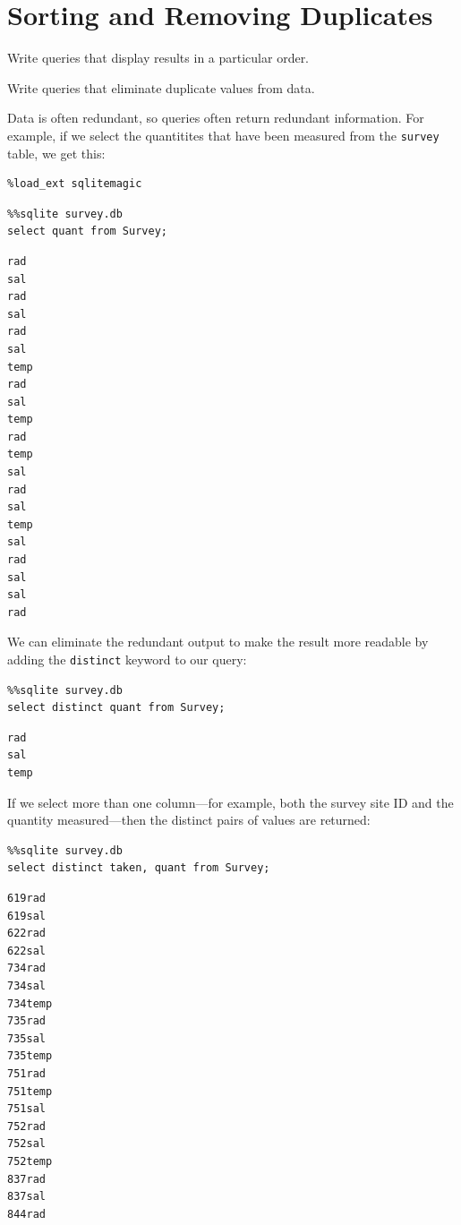 \documentclass{book}
\begin{document}
\section{Sorting and Removing Duplicates}

\begin{objectives}
\begin{swcitemize}
\item
  Write queries that display results in a particular order.
\item
  Write queries that eliminate duplicate values from data.
\end{swcitemize}
\end{objectives}

Data is often redundant, so queries often return redundant information.
For example, if we select the quantitites that have been measured from
the \texttt{survey} table, we get this:

\begin{verbatim}
%load_ext sqlitemagic
\end{verbatim}

\begin{verbatim}
%%sqlite survey.db
select quant from Survey;
\end{verbatim}

\begin{verbatim}
rad
sal
rad
sal
rad
sal
temp
rad
sal
temp
rad
temp
sal
rad
sal
temp
sal
rad
sal
sal
rad
\end{verbatim}

We can eliminate the redundant output to make the result more readable
by adding the \texttt{distinct} keyword to our query:

\begin{verbatim}
%%sqlite survey.db
select distinct quant from Survey;
\end{verbatim}

\begin{verbatim}
rad
sal
temp
\end{verbatim}

If we select more than one column---for example, both the survey site ID
and the quantity measured---then the distinct pairs of values are
returned:

\begin{verbatim}
%%sqlite survey.db
select distinct taken, quant from Survey;
\end{verbatim}

\begin{verbatim}
619rad
619sal
622rad
622sal
734rad
734sal
734temp
735rad
735sal
735temp
751rad
751temp
751sal
752rad
752sal
752temp
837rad
837sal
844rad
\end{verbatim}
\end{document}
